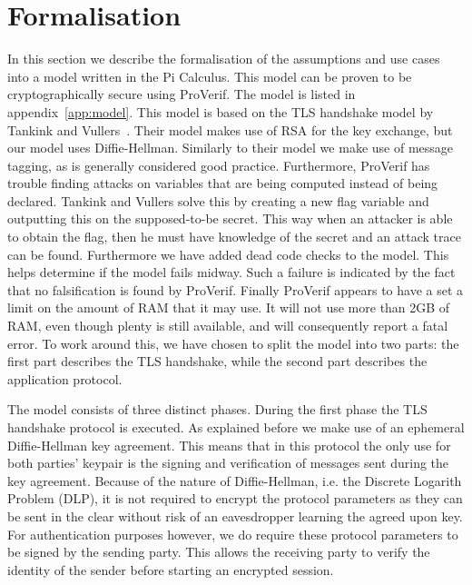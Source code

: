 \section{Formalisation}
\label{sec:formalisation}
In this section we describe the formalisation of the assumptions and use cases into a model written in the Pi Calculus. This model can be proven to be cryptographically secure using ProVerif. The model is listed in appendix~\ref{app:model}. This model is based on the TLS handshake model by Tankink and Vullers~\cite{tankink2008verification}. Their model makes use of RSA for the key exchange, but our model uses Diffie-Hellman. Similarly to their model we make use of message tagging, as is generally considered good practice. Furthermore, ProVerif has trouble finding attacks on variables that are being computed instead of being declared. Tankink and Vullers solve this by creating a new flag variable and outputting this on the supposed-to-be secret. This way when an attacker is able to obtain the flag, then he must have knowledge of the secret and an attack trace can be found. Furthermore we have added dead code checks to the model. This helps determine if the model fails midway. Such a failure is indicated by the fact that no falsification is found by ProVerif. Finally ProVerif appears to have a set a limit on the amount of RAM that it may use. It will not use more than 2GB of RAM, even though plenty is still available, and will consequently report a fatal error. To work around this, we have chosen to split the model into two parts: the first part describes the TLS handshake, while the second part describes the application protocol.

The model consists of three distinct phases. During the first phase the TLS handshake protocol is executed. As explained before we make use of an ephemeral Diffie-Hellman key agreement. This means that in this protocol the only use for both parties' keypair is the signing and verification of messages sent during the key agreement. Because of the nature of Diffie-Hellman, i.e. the Discrete Logarith Problem (DLP), it is not required to encrypt the protocol parameters as they can be sent in the clear without risk of an eavesdropper learning the agreed upon key. For authentication purposes however, we do require these protocol parameters to be signed by the sending party. This allows the receiving party to verify the identity of the sender before starting an encrypted session.

